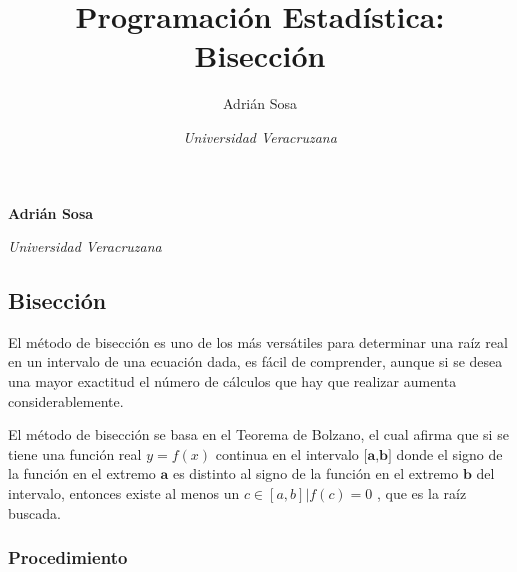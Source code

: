 \documentclass[11pt,]{article}
\title{Programación Estadística: Bisección  }
\author{\Large Adrián Sosa\vspace{0.05in} \newline\normalsize\emph{}   \and \Large \vspace{0.05in} \newline\normalsize\emph{Universidad Veracruzana}  }
\date{}
\newcommand*{\authorfont}{\fontfamily{phv}\selectfont}
\begin{document}
	
%

{%
\setlength{\parindent}{0pt}
\thispagestyle{plain}
{\fontsize{18}{20}\selectfont\raggedright 
\maketitle  %

}

{
   \vskip 13.5pt\relax \normalsize\fontsize{11}{12} 
\textbf{\authorfont Adrián Sosa} \hskip 15pt \emph{\small }   \par \textbf{\authorfont } \hskip 15pt \emph{\small Universidad Veracruzana}   
}

}






\vskip -8.5pt



\noindent  

\hypertarget{bisecciuxf3n}{%
\subsection{Bisección}\label{bisecciuxf3n}}

El método de bisección es uno de los más versátiles para determinar una
raíz real en un intervalo de una ecuación dada, es fácil de comprender,
aunque si se desea una mayor exactitud el número de cálculos que hay que
realizar aumenta considerablemente.

El método de bisección se basa en el Teorema de Bolzano, el cual afirma
que si se tiene una función real \(y = f(x)\) continua en el intervalo
\(\textbf{[a,b]}\) donde el signo de la función en el extremo
\(\textbf{a}\) es distinto al signo de la función en el extremo
\(\textbf{b}\) del intervalo, entonces existe al menos un
\(c \in [a,b] | f(c)=0\) , que es la raíz buscada.

\hypertarget{procedimiento}{%
\subsubsection{Procedimiento}\label{procedimiento}}
\end{document}
